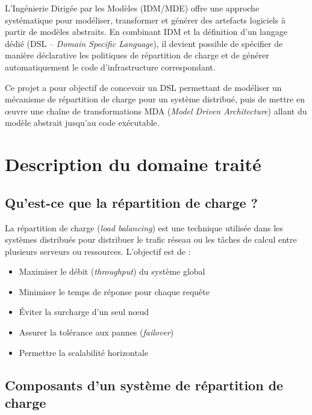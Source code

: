 \documentclass[12pt,a4paper]{report}
\begin{document}
L'Ingénierie Dirigée par les Modèles (IDM/MDE) offre une approche systématique pour modéliser, transformer et générer des artefacts logiciels à partir de modèles abstraits. En combinant IDM et la définition d'un langage dédié (DSL -- \textit{Domain Specific Language}), il devient possible de spécifier de manière déclarative les politiques de répartition de charge et de générer automatiquement le code d'infrastructure correspondant.

Ce projet a pour objectif de concevoir un DSL permettant de modéliser un mécanisme de répartition de charge pour un système distribué, puis de mettre en œuvre une chaîne de transformations MDA (\textit{Model Driven Architecture}) allant du modèle abstrait jusqu'au code exécutable.

\chapter{Description du domaine traité}

\section{Qu'est-ce que la répartition de charge ?}

La répartition de charge (\textit{load balancing}) est une technique utilisée dans les systèmes distribués pour distribuer le trafic réseau ou les tâches de calcul entre plusieurs serveurs ou ressources. L'objectif est de :

\begin{itemize}
  \item Maximiser le débit (\textit{throughput}) du système global
  \item Minimiser le temps de réponse pour chaque requête
  \item Éviter la surcharge d'un seul nœud
  \item Assurer la tolérance aux pannes (\textit{failover})
  \item Permettre la scalabilité horizontale
\end{itemize}

\section{Composants d'un système de répartition de charge}
\end{document}
